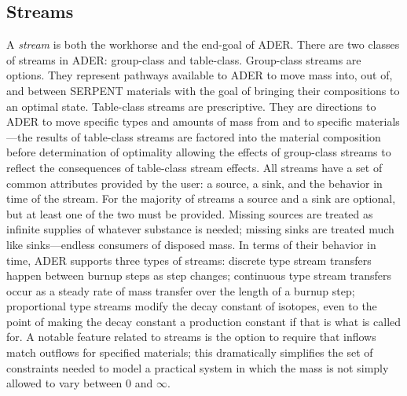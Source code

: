 \subsection{Streams} \label{ssec:streams}
A \textit{stream} is both the workhorse and the end-goal of ADER.
There are two classes of streams in ADER: group-class and table-class. 
Group-class streams are options. They represent pathways available to ADER to 
move mass into, out of,
and between SERPENT materials with the goal of bringing their compositions to an
optimal state. Table-class streams are prescriptive. They are directions to
ADER to move specific types and amounts of mass from and to specific materials
---the results of table-class streams are factored into the material 
composition before determination of optimality allowing the effects of 
group-class streams to reflect the consequences of table-class stream effects. 
All streams have a set of common attributes
provided by the user: a source, a sink, and the behavior in time of the stream.
For the majority of streams a source and a sink are optional, but at least one 
of the two must be provided. Missing sources are treated as infinite supplies 
of whatever substance is needed; missing sinks are treated much like 
sinks---endless consumers of disposed mass. In terms of their behavior in time,
ADER supports three types of streams: discrete type stream transfers happen
between burnup steps as step changes; continuous type stream transfers occur as
a steady rate of mass transfer over the length of a burnup step; proportional
type streams modify the decay constant
of isotopes, even to the point of making the decay constant a production
constant if that is what is called for. A notable feature related to streams
is the option to require that inflows match outflows for specified materials;
this dramatically simplifies the set of constraints needed to model a practical
system in which the mass is not simply allowed to vary between 0 and $\infty$.

